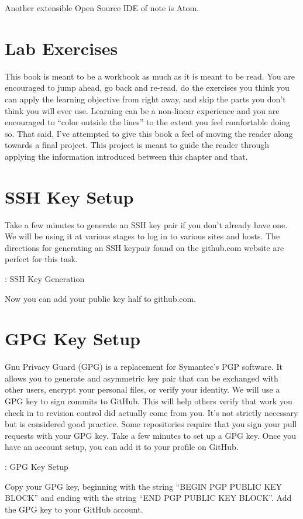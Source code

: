 \justify{}
Another extensible Open Source IDE of note is Atom.

\section{Lab Exercises}
\justify{}
This book is meant to be a workbook as much as it is meant to be read.
You are encouraged to jump ahead, go back and re-read, do the exercises
you think you can apply the learning objective from right away,
and skip the parts you don't think you will ever use. Learning can
be a non-linear experience and you
are encouraged to ``color outside the lines'' to the extent you feel
comfortable doing so.
\justify{}
That said, I've attempted to give this book a feel of moving the reader
along towards a final project.
This project is meant to guide the reader through applying the information
introduced between this chapter and that.
\section{SSH Key Setup}
\justify{}
Take a few minutes to generate an SSH key pair if you don't already have
one. We will be using it at various stages to log in to various sites
and hosts. The directions for generating an SSH keypair found on the
github.com website are perfect for this task.
\begin{mybox}{\thetcbcounter: SSH Key Generation}

\end{mybox}
\justify{}
Now you can add your public key half to github.com.
\section{GPG Key Setup}
\justify{}
Gnu Privacy Guard (GPG) is a replacement for Symantec's PGP software. It allows you
to generate and asymmetric key pair that can be exchanged with other users, encrypt your
personal files, or verify your identity.
\justify{}
We will use a GPG key to sign commits
to GitHub. This will help others verify that work you check in to revision control did
actually come from you. It's not strictly necessary but is considered good practice.
Some repositories require that you sign your pull requests with your GPG key.
\justify{}
Take a few minutes to set up a GPG key. Once you have an account setup, you can add
it to your profile on GitHub.
\justify{}
\begin{mybox}{\thetcbcounter: GPG Key Setup}

\end{mybox}
\justify{}
Copy your GPG key, beginning with the string ``BEGIN PGP PUBLIC KEY BLOCK'' and ending with the string
``END PGP PUBLIC KEY BLOCK''. Add the GPG key to your GitHub account.
